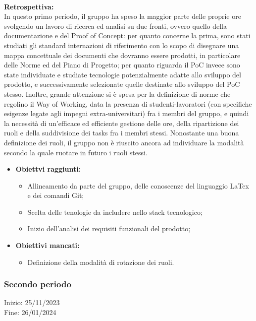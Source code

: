 \paragraph{}
\textbf{Retrospettiva:} \\
In questo primo periodo, il gruppo ha speso la maggior parte delle proprie ore svolgendo un lavoro di ricerca ed analisi 
su due fronti, ovvero quello della documentazione e del Proof of Concept: per quanto concerne la prima, sono stati studiati gli standard internazioni di riferimento
con lo scopo di disegnare una mappa concettuale dei documenti che dovranno essere prodotti, in particolare delle Norme ed del Piano di Progetto; per quanto 
riguarda il PoC invece sono state individuate e studiate tecnologie potenzialmente adatte allo sviluppo del prodotto, e successivamente selezionate quelle destinate 
allo sviluppo del PoC stesso. Inoltre, grande attenzione si è spesa per la definizione di norme che regolino il Way of Working, data la presenza di studenti-lavoratori (con 
specifiche esigenze legate agli impegni extra-universitari) fra i membri del gruppo, e quindi la necessità di un'efficace ed efficiente gestione delle ore, della ripartizione dei ruoli
e della suddivisione dei tasks fra i membri stessi. Nonostante una buona definizione dei ruoli, il gruppo non è riuscito ancora ad individuare la modalità secondo la quale
ruotare in futuro i ruoli stessi.
\begin{itemize}
    \item \textbf{Obiettvi raggiunti:}
    \begin{itemize}
        \item Allineamento da parte del gruppo, delle conoscenze del linguaggio LaTex e dei comandi Git;
        \item Scelta delle tenologie da includere nello stack tecnologico;
        \item Inizio dell'analisi dei requisiti funzionali del prodotto;
    \end{itemize}
    \item \textbf{Obiettivi mancati:}
    \begin{itemize}
        \item Definizione della modalità di rotazione dei ruoli.
    \end{itemize}
\end{itemize}

\subsubsection{Secondo periodo} 
Inizio: 25/11/2023 \\
Fine: 26/01/2024 \\

